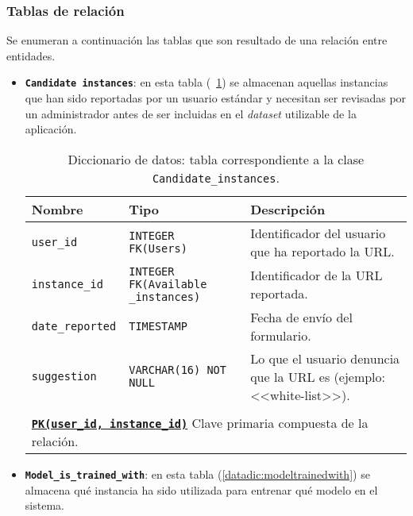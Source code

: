 \subsubsection{Tablas de relación}

Se enumeran a continuación las tablas que son resultado de una relación entre entidades.

\begin{itemize}
	\item \textbf{\texttt{Candidate instances}}: en esta tabla (~\ref{datadic:candidate_instances}) se almacenan aquellas instancias que han sido reportadas por un usuario estándar y necesitan ser revisadas por un administrador antes de ser incluidas en el \textit{dataset} utilizable de la aplicación.
	
		\begin{table}
		\small
		\begin{centering}
			\begin{tabular}{@{}p{7em} p{7em} p{18em}@{}}
				\toprule
				\textbf{Nombre} & \textbf{Tipo} & \textbf{Descripción}\\
				\midrule
				\texttt{user\_id} & \texttt{INTEGER FK(Users)} & Identificador del usuario que ha reportado la URL. \\
				\texttt{instance\_id} & \texttt{INTEGER FK(Available \_instances)} & Identificador de la URL reportada. \\
				\texttt{date\_reported} & \texttt{TIMESTAMP} & Fecha de envío del formulario.     \\
				\texttt{suggestion} & \texttt{VARCHAR(16) NOT NULL} & Lo que el usuario denuncia que la URL es (ejemplo: <<white-list>>).   \\\\
				\multicolumn{3}{l}{\texttt{\textbf{\underline{PK(user\_id, instance\_id)}}} Clave primaria compuesta de la relación.} \\
				\bottomrule
			\end{tabular}
		\end{centering}
		\caption[Diccionario de datos: Candidate\_instances]{Diccionario de datos: tabla correspondiente a la clase \texttt{Candidate\_instances}.}
		\label{datadic:candidate_instances}
		\end{table}

	\item \textbf{\texttt{Model\_is\_trained\_with}}: en esta tabla (\ref{datadic:modeltrainedwith}) se almacena qué instancia ha sido utilizada para entrenar qué modelo en el sistema.
	

\end{itemize}
